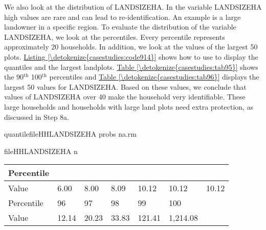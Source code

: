 \documentclass[letterpaper,10pt,english]{sphinxmanual}
\begin{document}
We also look at the distribution of LANDSIZEHA. In the variable
LANDSIZEHA high values are rare and can lead to re-identification. An
example is a large landowner in a specific region. To evaluate the
distribution of the variable LANDSIZEHA, we look at the percentiles.
Every percentile represents approximately 20 households. In addition, we
look at the values of the largest 50 plots. \hyperref[\detokenize{casestudies:code914}]{Listing \ref{\detokenize{casestudies:code914}}} shows how to
use  to display the quantiles and the largest landplots. \hyperref[\detokenize{casestudies:tab95}]{Table \ref{\detokenize{casestudies:tab95}}}
shows the 90$^{\text{th}}$ \textendash{} 100$^{\text{th}}$ percentiles and \hyperref[\detokenize{casestudies:tab96}]{Table \ref{\detokenize{casestudies:tab96}}}
displays the largest 50 values for LANDSIZEHA. Based on these values, we
conclude that values of LANDSIZEHA over 40 make the household very
identifiable. These large households and households with large land
plots need extra protection, as discussed in Step 8a.

\def\sphinxLiteralBlockLabel{\label{\detokenize{casestudies:code914}}}
%
\begin{sphinxVerbatim}[commandchars=\\\{\},numbers=left,firstnumber=1,stepnumber=1]
quantilefileHHLANDSIZEHA probs   na.rm 

fileHHLANDSIZEHA n  
\end{sphinxVerbatim}


\begin{savenotes}\sphinxattablestart
\centering
{}
\label{\detokenize{casestudies:tab95}}\label{\detokenize{casestudies:id25}}
\sphinxaftercaption
\begin{tabulary}{\linewidth}[t]{|T|T|T|T|T|T|T|}
\hline
\sphinxstyletheadfamily 
Percentile
&
&
&
&
&
&
\\
\hline
Value
&
6.00
&
8.00
&
8.09
&
10.12
&
10.12
&
10.12
\\
\hline
Percentile
&
96
&
97
&
98
&
99
&
100
&\\
\hline
Value
&
12.14
&
20.23
&
33.83
&
121.41
&
1,214.08
&\\
\hline
\end{tabulary}
\par
\sphinxattableend\end{savenotes}
\end{document}
